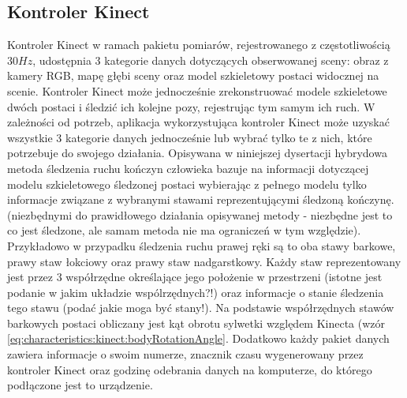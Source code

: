 \subsection{Kontroler Kinect}
Kontroler Kinect w ramach pakietu pomiarów, rejestrowanego z częstotliwością $30 Hz$, udostępnia 3 kategorie danych dotyczących obserwowanej sceny: obraz z kamery RGB, mapę głębi sceny oraz model szkieletowy postaci widocznej na scenie. Kontroler Kinect może jednocześnie zrekonstruować modele szkieletowe dwóch postaci i śledzić ich kolejne pozy, rejestrując tym samym ich ruch. W zależności od potrzeb, aplikacja wykorzystująca kontroler Kinect może uzyskać wszystkie 3 kategorie danych jednocześnie lub wybrać tylko te z nich, które potrzebuje do swojego działania. Opisywana w niniejszej dysertacji hybrydowa metoda śledzenia ruchu kończyn człowieka bazuje na informacji dotyczącej modelu szkieletowego śledzonej postaci wybierając z pełnego modelu tylko informacje związane z wybranymi stawami reprezentującymi śledzoną kończynę. (niezbędnymi do prawidłowego działania opisywanej metody - niezbędne jest to co jest śledzone, ale samam metoda nie ma ograniczeń w tym względzie). Przykładowo w przypadku śledzenia ruchu prawej ręki są to oba stawy barkowe, prawy staw łokciowy oraz prawy staw nadgarstkowy. Każdy staw reprezentowany jest przez 3 współrzędne określające jego położenie w przestrzeni (istotne jest podanie w jakim układzie wspólrzędnych?!) oraz informacje o stanie śledzenia tego stawu (podać jakie moga być stany!). Na podstawie współrzędnych stawów barkowych postaci obliczany jest kąt obrotu sylwetki względem Kinecta (wzór \eqref{eq:characteristics:kinect:bodyRotationAngle}. Dodatkowo każdy pakiet danych zawiera informacje o swoim numerze, znacznik czasu wygenerowany przez kontroler Kinect oraz godzinę odebrania danych na komputerze, do którego podłączone jest to urządzenie.

